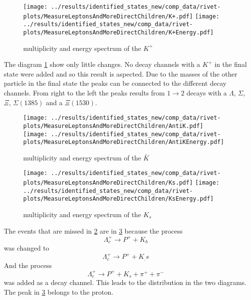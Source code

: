 \begin{figure}[h]
  \centering
  \texttt{[image: ../results/identified\_states\_new/comp\_data/rivet-plots/MeasureLeptonsAndMoreDirectChildren/K+.pdf]}
  \texttt{[image: ../results/identified\_states\_new/comp\_data/rivet-plots/MeasureLeptonsAndMoreDirectChildren/K+Energy.pdf]}
  \caption{multiplicity and energy spectrum of the \(K^+\)} \label{gr:prim-Kp}
\end{figure}
The diagram {\ref{gr:prim-Kp}} show only little changes. No decay channels 
with a \(K^+\) in the final state were added and so this result is aspected. 
Due to the masses of the other particle in the final state the peaks can be 
connected to the different decay channels. From right to the left the peaks 
results from \( 1 \rightarrow 2 \) decays with a \(\Lambda\), \(\Sigma\), \(\Xi\),
\(\Sigma(1385)\) and a \(\Xi(1530)\).\\

\begin{figure}[h]
  \centering
  \texttt{[image: ../results/identified\_states\_new/comp\_data/rivet-plots/MeasureLeptonsAndMoreDirectChildren/AntiK.pdf]}
  \texttt{[image: ../results/identified\_states\_new/comp\_data/rivet-plots/MeasureLeptonsAndMoreDirectChildren/AntiKEnergy.pdf]}
  \caption{multiplicity and energy spectrum of the \(\bar{K}\)} \label{gr:prim-Kb}
\end{figure}
\begin{figure}[h]
  \centering
  \texttt{[image: ../results/identified\_states\_new/comp\_data/rivet-plots/MeasureLeptonsAndMoreDirectChildren/Ks.pdf]}
  \texttt{[image: ../results/identified\_states\_new/comp\_data/rivet-plots/MeasureLeptonsAndMoreDirectChildren/KsEnergy.pdf]}
  \caption{multiplicity and energy spectrum of the \(K_s\)} \label{gr:prim-Ks}
\end{figure}
The events that are missed in {\ref{gr:prim-Kb}} are in {\ref{gr:prim-Ks}}
because the process
\begin{equation}
  \Lambda_c^+ \rightarrow P^+ + K_b \nonumber
\end{equation}
was changed to 
\begin{equation}
  \Lambda_c^+ \rightarrow P^+ + K_.s \nonumber
\end{equation}
And the process
\begin{equation}
  \Lambda_c^+ \rightarrow P^+ + K_s + \pi^+ + \pi^- \nonumber
\end{equation}
was added as a decay channel. This leads to the distribution in the two diagrams. 
The peak in {\ref{gr:prim-Ks}} belongs to the proton.\\

